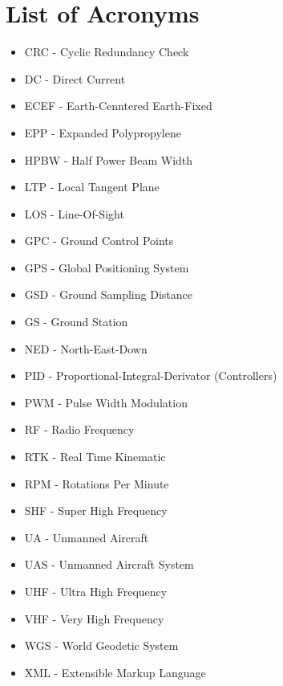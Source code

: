 \section*{List of Acronyms}
\begin{itemize}
	\item CRC - Cyclic Redundancy Check
	\item DC - Direct Current
	\item ECEF - Earth-Cenntered Earth-Fixed
	\item EPP - Expanded Polypropylene
	\item HPBW - Half Power Beam Width
	\item LTP - Local Tangent Plane
	\item LOS - Line-Of-Sight
	\item GPC - Ground Control Points
	\item GPS - Global Positioning System
	\item GSD - Ground Sampling Distance
	\item GS - Ground Station
	\item NED - North-East-Down
	\item PID - Proportional-Integral-Derivator (Controllers)
	\item PWM - Pulse Width Modulation
	\item RF - Radio Frequency
	\item RTK - Real Time Kinematic
	\item RPM - Rotations Per Minute
	\item SHF - Super High Frequency
	\item UA - Unmanned Aircraft
	\item UAS - Unmanned Aircraft System
	\item UHF - Ultra High Frequency
	\item VHF - Very High Frequency
	\item WGS - World Geodetic System
	\item XML - Extensible Markup Language
\end{itemize}